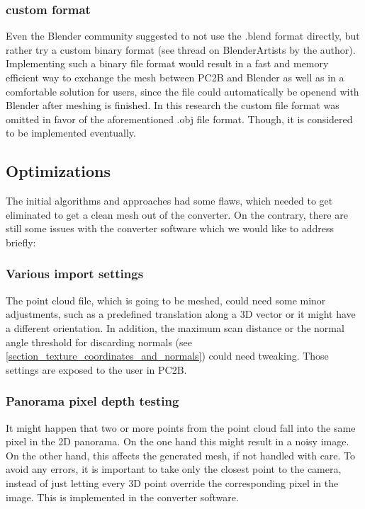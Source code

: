 \subsubsection{custom format}

Even the Blender community suggested to not use the .blend format directly, but rather try a custom binary format (see thread on BlenderArtists \parencite{webBlenderArtistsBlendExport} by the author). Implementing such a binary file format would result in a fast and memory efficient way to exchange the mesh between PC2B and Blender as well as in a comfortable solution for users, since the file could automatically be openend with Blender after meshing is finished. In this research the custom file format was omitted in favor of the aforementioned .obj file format. Though, it is considered to be implemented eventually.

\subsection{Optimizations}

The initial algorithms and approaches had some flaws, which needed to get eliminated to get a clean mesh out of the converter. On the contrary, there are still some issues with the converter software which we would like to address briefly:

\subsubsection{Various import settings}

The point cloud file, which is going to be meshed, could need some minor adjustments, such as a predefined translation along a 3D vector or it might have a different orientation. In addition, the maximum scan distance or the normal angle threshold for discarding normals (see \ref{section_texture_coordinates_and_normals}) could need tweaking. Those settings are exposed to the user in PC2B.

\subsubsection{Panorama pixel depth testing}

It might happen that two or more points from the point cloud fall into the same pixel in the 2D panorama. On the one hand this might result in a noisy image. On the other hand, this affects the generated mesh, if not handled with care. To avoid any errors, it is important to take only the closest point to the camera, instead of just letting every 3D point override the corresponding pixel in the image. This is implemented in the converter software.


